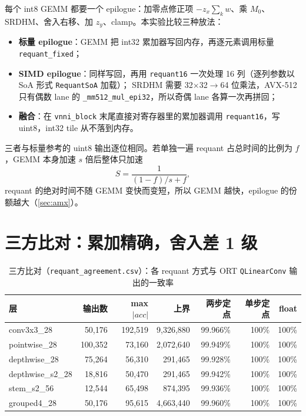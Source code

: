 \documentclass[11pt,a4paper]{ctexart}
\begin{document}
每个 int8 GEMM 都要一个 epilogue：加零点修正项 $-z_x\sum_k w$、乘 $M_0$、SRDHM、舍入右移、加 $z_y$、clamp。本实验比较三种放法：

\begin{itemize}
  \item \textbf{标量 epilogue}：GEMM 把 int32 累加器写回内存，再逐元素调用标量 \texttt{requant\_fixed}；
  \item \textbf{SIMD epilogue}：同样写回，再用 \texttt{requant16} 一次处理 16 列（逐列参数以 SoA 形式 \texttt{RequantSoA} 加载）；
        SRDHM 需要 32$\times$32$\to$64 位乘法，AVX-512 只有偶数 lane 的 \texttt{\_mm512\_mul\_epi32}，所以奇偶 lane 各算一次再拼回；
  \item \textbf{融合}：在 \texttt{vnni\_block} 末尾直接对寄存器里的累加器调用 \texttt{requant16}，写 uint8，int32 tile 从不落到内存。
\end{itemize}

三者与标量参考的 uint8 输出逐位相同。若单独一遍 requant 占总时间的比例为 $f$，GEMM 本身加速 $s$ 倍后整体只加速
\begin{equation}
S = \frac{1}{(1-f)/s + f},
\label{eq:amdahl}
\end{equation}
requant 的绝对时间不随 GEMM 变快而变短，所以 GEMM 越快，epilogue 的份额越大（\cref{sec:amx}）。

\section{三方比对：累加精确，舍入差 1 级}\label{sec:agree}

\begin{table}[H]
\centering\small
\caption{三方比对（\texttt{requant\_agreement.csv}）：各 requant 方式与 ORT \texttt{QLinearConv} 输出的一致率}\label{tab:agree}
\begin{tabular}{lrrrrrr}
\toprule
层 & 输出数 & max$|acc|$ & 上界 & 两步定点 & 单步定点 & float \\
\midrule
conv3x3\_28 & 50,176 & 192,519 & 9,326,880 & 99.966\% & 100\% & 100\% \\
pointwise\_28 & 100,352 & 73,160 & 2,072,640 & 99.949\% & 100\% & 100\% \\
depthwise\_28 & 75,264 & 56,310 & 291,465 & 99.928\% & 100\% & 100\% \\
depthwise\_s2\_28 & 18,816 & 50,470 & 291,465 & 99.942\% & 100\% & 100\% \\
stem\_s2\_56 & 12,544 & 65,498 & 874,395 & 99.936\% & 100\% & 100\% \\
grouped4\_28 & 50,176 & 95,615 & 4,663,440 & 99.960\% & 100\% & 100\% \\
\bottomrule
\end{tabular}
\end{table}
\end{document}
